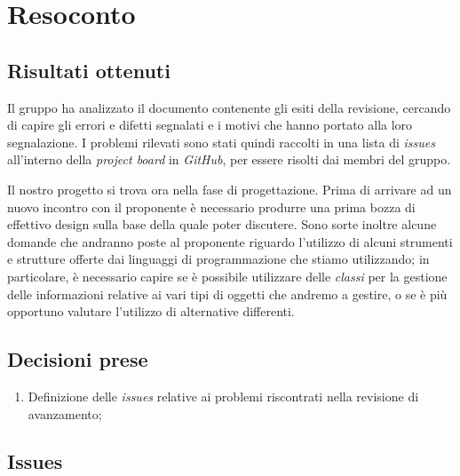 \section{Resoconto}

\subsection{Risultati ottenuti}
Il gruppo ha analizzato il documento contenente gli esiti della revisione, cercando di capire gli errori e difetti segnalati e i motivi che hanno portato alla loro segnalazione. I problemi rilevati sono stati quindi raccolti in una lista di \textit{issues} all'interno della \textit{project board} in \textit{GitHub}, per essere risolti dai membri del gruppo.

Il nostro progetto si trova ora nella fase di progettazione. Prima di arrivare ad un nuovo incontro con il proponente è necessario produrre una prima bozza di effettivo design sulla base della quale poter discutere. Sono sorte inoltre alcune domande che andranno poste al proponente riguardo l'utilizzo di alcuni strumenti e strutture offerte dai linguaggi di programmazione che stiamo utilizzando; in particolare, è necessario capire se è possibile utilizzare delle \textit{classi} per la gestione delle informazioni relative ai vari tipi di oggetti che andremo a gestire, o se è più opportuno valutare l'utilizzo di alternative differenti.

\subsection{Decisioni prese}

\begin{enumerate}
    \item Definizione delle \textit{issues} relative ai problemi riscontrati nella revisione di avanzamento;
\end{enumerate}

\subsection{Issues}

